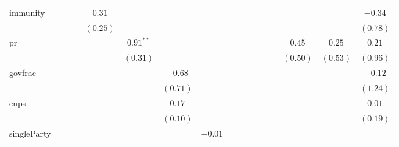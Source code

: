 \documentclass[a4paper]{article}\usepackage{graphicx, color}
\begin{document}
\begin{landscape}
\begin{table}
{{\begin{tabular}{l c c c c c c c c c c c c c c c c }
immunity            &               &               &               & $0.31$        &               &               &               &               &               &          &               &          &          &              &             & $-0.34$             \\
                    &               &               &               & $(0.25)$      &               &               &               &               &               &          &               &          &          &              &             & $(0.78)$            \\
pr                  &               &               &               &               & $0.91^{**}$   &               &               &               &               &          &               &          &          & $0.45$       & $0.25$      & $0.21$              \\
                    &               &               &               &               & $(0.31)$      &               &               &               &               &          &               &          &          & $(0.50)$     & $(0.53)$    & $(0.96)$            \\
govfrac             &               &               &               &               &               & $-0.68$       &               &               &               &          &               &          &          &              &             & $-0.12$             \\
                    &               &               &               &               &               & $(0.71)$      &               &               &               &          &               &          &          &              &             & $(1.24)$            \\
enps                &               &               &               &               &               & $0.17$        &               &               &               &          &               &          &          &              &             & $0.01$              \\
                    &               &               &               &               &               & $(0.10)$      &               &               &               &          &               &          &          &              &             & $(0.19)$            \\
singleParty         &               &               &               &               &               &               & $-0.01$       &               &               &          &               &          &          &              &             &                     \\

\end{tabular}}}
\end{table}
\end{landscape}
\end{document}
